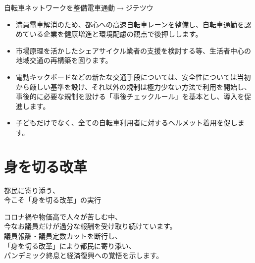 \documentclass[dvipdfmx]{beamer}
\begin{document}
    \begin{frame}{自転車ネットワークを整備}{電車通勤$\rightarrow$ジテツウ}
        \begin{small}
            \begin{itemize}
                \setlength{\itemsep}{2mm}
                \item 満員電車解消のため、都心への高速自転車レーンを整備し、自転車通勤を認めている企業を健康増進と環境配慮の観点で後押しします。
                \item 市場原理を活かしたシェアサイクル業者の支援を検討する等、生活者中心の地域交通の再構築を図ります。
                \item 電動キックボードなどの新たな交通手段については、安全性については当初から厳しい基準を設け、それ以外の規制は極力少ない方法で利用を開始し、事後的に必要な規制を設ける「事後チェックルール」を基本とし、導入を促進します。
                \item 子どもだけでなく、全ての自転車利用者に対するヘルメット着用を促します。
            \end{itemize}
        \end{small}
    \end{frame}

\section{身を切る改革}
    \begin{frame}
        \sectionpage
        \begin{center}
            \begin{large}
                \alert{都民に寄り添う、}\\\alert{今こそ「身を切る改革」の実行}
            \end{large}
        \end{center}
        \begin{small}
            コロナ禍や物価高で人々が苦しむ中、\\
            今なお議員だけが過分な報酬を受け取り続けています。\\
            議員報酬・議員定数カットを断行し、\\
            「身を切る改革」により都民に寄り添い、\\
            パンデミック終息と経済復興への覚悟を示します。
        \end{small}
    \end{frame}
\end{document}
